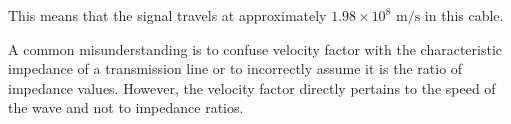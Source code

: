 This means that the signal travels at approximately \( 1.98 \times 10^8 \text{ m/s} \) in this cable.

A common misunderstanding is to confuse velocity factor with the characteristic impedance of a transmission line or to incorrectly assume it is the ratio of impedance values. However, the velocity factor directly pertains to the speed of the wave and not to impedance ratios.

    
    
